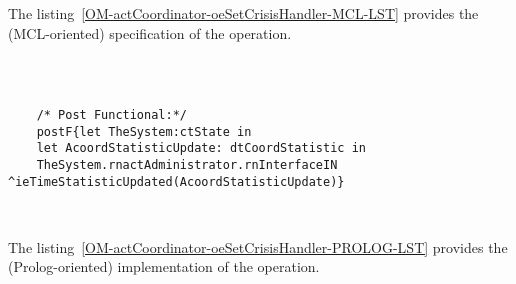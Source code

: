 	\vspace{1cm}
	The listing~\ref{OM-actCoordinator-oeSetCrisisHandler-MCL-LST} provides the \msrmessir (MCL-oriented) specification of the operation.
	
	\scriptsize
	\vspace{0.5cm}
	\begin{lstlisting}[style=MessirStyle,firstnumber=auto,captionpos=b,caption={\msrmessir (MCL-oriented) specification of the operation \emph{oeSetCrisisHandler}.},label=OM-actCoordinator-oeSetCrisisHandler-MCL-LST]

	
	
	/* Post Functional:*/ 
	postF{let TheSystem:ctState in
	let AcoordStatisticUpdate: dtCoordStatistic in
	TheSystem.rnactAdministrator.rnInterfaceIN ^ieTimeStatisticUpdated(AcoordStatisticUpdate)}
	
	
	\end{lstlisting}
	\normalsize 
	
	
	
	
	
	\vspace{1cm}
	The listing~\ref{OM-actCoordinator-oeSetCrisisHandler-PROLOG-LST} provides the \msrmessir (Prolog-oriented) implementation of the operation.
	
	\scriptsize
	\vspace{0.5cm}
	
	
	\normalsize





